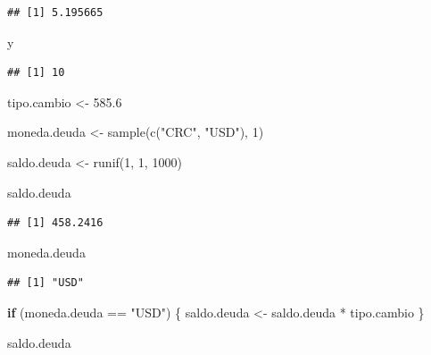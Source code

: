 \documentclass[
  12pt,
]{book}
\newenvironment{Shaded}{\begin{snugshade}}{\end{snugshade}}
\newcommand{\ControlFlowTok}[1]{\textcolor[rgb]{0.13,0.29,0.53}{\textbf{#1}}}
\newcommand{\DecValTok}[1]{\textcolor[rgb]{0.00,0.00,0.81}{#1}}
\newcommand{\FloatTok}[1]{\textcolor[rgb]{0.00,0.00,0.81}{#1}}
\newcommand{\FunctionTok}[1]{\textcolor[rgb]{0.00,0.00,0.00}{#1}}
\newcommand{\NormalTok}[1]{#1}
\newcommand{\OtherTok}[1]{\textcolor[rgb]{0.56,0.35,0.01}{#1}}
\newcommand{\SpecialCharTok}[1]{\textcolor[rgb]{0.00,0.00,0.00}{#1}}
\newcommand{\StringTok}[1]{\textcolor[rgb]{0.31,0.60,0.02}{#1}}
\begin{document}
\begin{verbatim}
## [1] 5.195665
\end{verbatim}

\begin{Shaded}
\begin{Highlighting}[]
\NormalTok{y}
\end{Highlighting}
\end{Shaded}

\begin{verbatim}
## [1] 10
\end{verbatim}

\begin{Shaded}
\begin{Highlighting}[]
\NormalTok{tipo.cambio }\OtherTok{\textless{}{-}} \FloatTok{585.6}

\NormalTok{moneda.deuda }\OtherTok{\textless{}{-}} \FunctionTok{sample}\NormalTok{(}\FunctionTok{c}\NormalTok{(}\StringTok{"CRC"}\NormalTok{, }\StringTok{"USD"}\NormalTok{), }\DecValTok{1}\NormalTok{)}

\NormalTok{saldo.deuda }\OtherTok{\textless{}{-}} \FunctionTok{runif}\NormalTok{(}\DecValTok{1}\NormalTok{, }\DecValTok{1}\NormalTok{, }\DecValTok{1000}\NormalTok{)}

\NormalTok{saldo.deuda}
\end{Highlighting}
\end{Shaded}

\begin{verbatim}
## [1] 458.2416
\end{verbatim}

\begin{Shaded}
\begin{Highlighting}[]
\NormalTok{moneda.deuda}
\end{Highlighting}
\end{Shaded}

\begin{verbatim}
## [1] "USD"
\end{verbatim}

\begin{Shaded}
\begin{Highlighting}[]
\ControlFlowTok{if}\NormalTok{ (moneda.deuda }\SpecialCharTok{==} \StringTok{"USD"}\NormalTok{) \{}
\NormalTok{  saldo.deuda }\OtherTok{\textless{}{-}}\NormalTok{ saldo.deuda }\SpecialCharTok{*}\NormalTok{ tipo.cambio}
\NormalTok{\}}


\NormalTok{saldo.deuda}
\end{Highlighting}
\end{Shaded}
\end{document}

